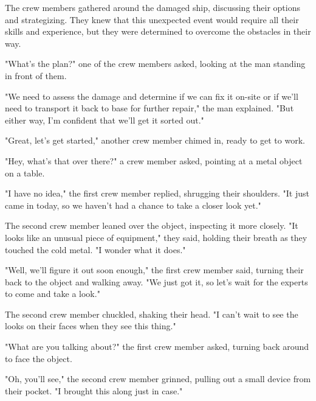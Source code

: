 \documentclass[smalldemyvopaper,11pt,twoside,onecolumn,openright,extrafontsizes]{memoir}
\begin{document}
The crew members gathered around the damaged ship, discussing their options and strategizing. They knew that this unexpected event would require all their skills and experience, but they were determined to overcome the obstacles in their way.\par
"What's the plan?" one of the crew members asked, looking at the man standing in front of them.\par
"We need to assess the damage and determine if we can fix it on-site or if we'll need to transport it back to base for further repair," the man explained. "But either way, I'm confident that we'll get it sorted out."\par
"Great, let's get started," another crew member chimed in, ready to get to work.\par
"Hey, what's that over there?" a crew member asked, pointing at a metal object on a table.\par
"I have no idea," the first crew member replied, shrugging their shoulders. "It just came in today, so we haven't had a chance to take a closer look yet."\par
The second crew member leaned over the object, inspecting it more closely. "It looks like an unusual piece of equipment," they said, holding their breath as they touched the cold metal. "I wonder what it does."\par
"Well, we'll figure it out soon enough," the first crew member said, turning their back to the object and walking away. "We just got it, so let's wait for the experts to come and take a look."\par
The second crew member chuckled, shaking their head. "I can't wait to see the looks on their faces when they see this thing."\par
"What are you talking about?" the first crew member asked, turning back around to face the object.\par
"Oh, you'll see," the second crew member grinned, pulling out a small device from their pocket. "I brought this along just in case."\par
\end{document}
